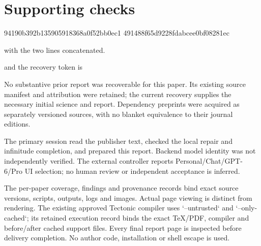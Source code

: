 \documentclass[10pt]{article}
\begin{document}
\section*{Supporting checks}
94190b392b135905918368a0f52bb0ec1
491488f65d9228fdabcee0bf08281ec\par
with the two lines concatenated.\par
and the recovery token is\par
No substantive prior report was recoverable for this paper. Its existing source manifest and attribution were retained; the current recovery supplies the necessary initial science and report. Dependency preprints were acquired as separately versioned sources, with no blanket equivalence to their journal editions.\par
The primary session read the publisher text, checked the local repair and infinitude completion, and prepared this report. Backend model identity was not independently verified. The external controller reports Personal/Chat/GPT-6/Pro UI selection; no human review or independent acceptance is inferred.\par
The per-paper coverage, findings and provenance records bind exact source versions, scripts, outputs, logs and images. Actual page viewing is distinct from rendering. The existing approved Tectonic compiler uses `–untrusted` and `–only-cached`; its retained execution record binds the exact TeX/PDF, compiler and before/after cached support files. Every final report page is inspected before delivery completion. No author code, installation or shell escape is used.\par
\end{document}
